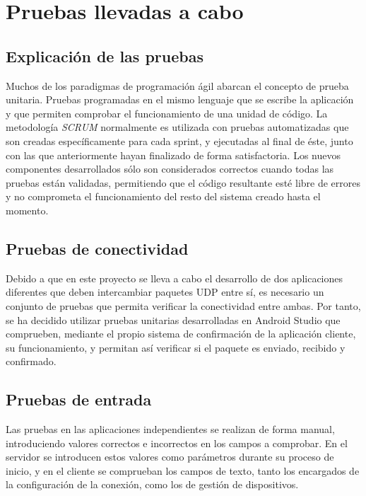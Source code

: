 \documentclass[12pt, twoside]{article}
\begin{document}
\cleardoublepage \section{Pruebas llevadas a cabo} \label{sec:pru}
    \subsection{Explicación de las pruebas}
    Muchos de los paradigmas de programación ágil abarcan el concepto de prueba unitaria. Pruebas programadas en el mismo lenguaje que se escribe la aplicación y que permiten comprobar el funcionamiento de una unidad de código. La metodología \textit{SCRUM} normalmente es utilizada con pruebas automatizadas que son creadas específicamente para cada sprint, y ejecutadas al final de éste, junto con las que anteriormente hayan finalizado de forma satisfactoria. Los nuevos componentes desarrollados sólo son considerados correctos cuando todas las pruebas están validadas, permitiendo que el código resultante esté libre de errores y no comprometa el funcionamiento del resto del sistema creado hasta el momento.

    \subsection{Pruebas de conectividad}
    Debido a que en este proyecto se lleva a cabo el desarrollo de dos aplicaciones diferentes que deben intercambiar paquetes UDP entre sí, es necesario un conjunto de pruebas que permita verificar la conectividad entre ambas. Por tanto, se ha decidido utilizar pruebas unitarias desarrolladas en Android Studio que comprueben, mediante el propio sistema de confirmación de la aplicación cliente, su funcionamiento, y permitan así verificar si el paquete es enviado, recibido y confirmado.

    \subsection{Pruebas de entrada}
    Las pruebas en las aplicaciones independientes se realizan de forma manual, introduciendo valores correctos e incorrectos en los campos a comprobar. En el servidor se introducen estos valores como parámetros durante su proceso de inicio, y en el cliente se comprueban los campos de texto, tanto los encargados de la configuración de la conexión, como los de gestión de dispositivos.
\end{document}
